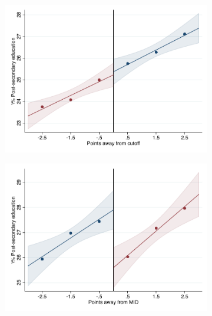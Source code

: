 \documentclass[oneside,11pt]{article}
\begin{document}
\begin{figure}[H]

    \ContinuedFloat
    \caption{(Cont.) RD plots for outcome variables across those assigned to UNAM high-school, and those who are not\label{fig:ITT_rd_plot_UNAM_5}}
    \begin{center}
    
    \begin{subfigure}{0.475\textwidth}
        \centering
        \includegraphics[width=\textwidth]{04_Figures/rd_plot_tau_licenciatura_mas_UNAM3.pdf}
    \end{subfigure}
    \begin{subfigure}{0.475\textwidth}
        \centering
        \includegraphics[width=\textwidth]{04_Figures/rd_plot_mid_licenciatura_mas_UNAM3.pdf}
    \end{subfigure}


\end{center}
\end{figure}
\end{document}
